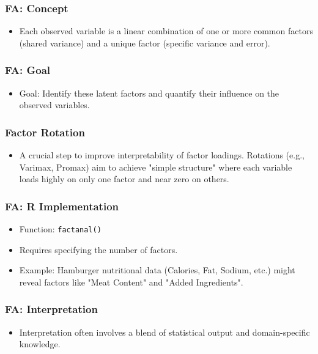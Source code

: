 \documentclass{beamer}
\newcommand{\code}[1]{\texttt{#1}}
\begin{document}
\begin{frame}
    \frametitle{FA: Concept}
    \begin{itemize}
        \item Each observed variable is a linear combination of one or more common factors (shared variance) and a unique factor (specific variance and error).
    \end{itemize}
\end{frame}

\begin{frame}
    \frametitle{FA: Goal}
    \begin{itemize}
        \item Goal: Identify these latent factors and quantify their influence on the observed variables.
    \end{itemize}
\end{frame}

\begin{frame}
    \frametitle{Factor Rotation}
    \begin{itemize}
        \item A crucial step to improve interpretability of factor loadings. Rotations (e.g., Varimax, Promax) aim to achieve "simple structure" where each variable loads highly on only one factor and near zero on others.
    \end{itemize}
\end{frame}

\begin{frame}
    \frametitle{FA: R Implementation}
    \begin{itemize}
        \item Function: \code{factanal()}
        \item Requires specifying the number of factors.
        \item Example: Hamburger nutritional data (Calories, Fat, Sodium, etc.) might reveal factors like "Meat Content" and "Added Ingredients".
    \end{itemize}
\end{frame}

\begin{frame}
    \frametitle{FA: Interpretation}
    \begin{itemize}
        \item Interpretation often involves a blend of statistical output and domain-specific knowledge.
    \end{itemize}
\end{frame}
\end{document}
